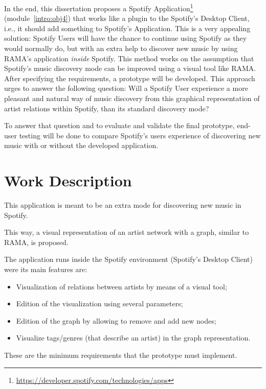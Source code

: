 \documentclass[twocolumn]{article}
\begin{document}
  In the end, this dissertation proposes a Spotify Application\footnote{\url{https://developer.spotify.com/technologies/apps}} (module~\ref{intro:obj4}) that works like a plugin to the Spotify's Desktop Client, i.e., it should add something to Spotify's Application.
  This is a very appealing solution: Spotify Users will have the chance to continue using Spotify as they would normally do, but with an extra help to discover new music by using RAMA's application \emph{inside} Spotify. 
  This method works on the assumption that Spotify's music discovery mode can be improved using a visual tool like RAMA. \\

  After specifying the requirements, a prototype will be developed.
  This approach urges to answer the following question: Will a Spotify User experience a more pleasant and natural way of music discovery from this graphical representation of artist relations within Spotify, than its standard discovery mode?

  To answer that question and to evaluate and validate the final prototype, end-user testing will be done to compare Spotify's users experience of discovering new music with or without the developed application.

\section{Work Description}
\label{sec:work}

  This application is meant to be an extra mode for discovering new music in Spotify.

  This way, a visual representation of an artist network with a graph, similar to RAMA, is proposed.

  The application runs inside the Spotify environment (Spotify's Desktop Client) were its main features are: 

  \begin{itemize}
    \item Visualization of relations between artists by means of a visual tool;
    \item Edition of the visualization using several parameters;
    \item Edition of the graph by allowing to remove and add new nodes;
    \item Visualize tags/genres (that describe an artist) in the graph representation.
  \end{itemize}

  These are the minimum requirements that the prototype must implement.
\end{document}
